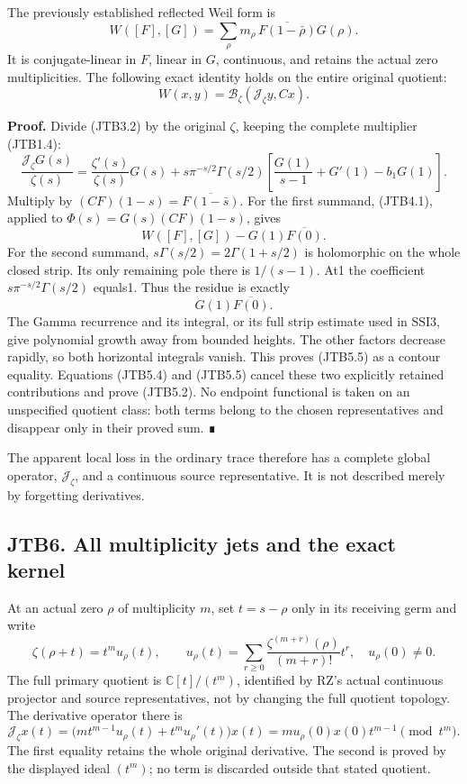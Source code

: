The previously established reflected Weil form is \[
W([F],[G])=\sum_\rho m_\rho\,
\overline{F(1-\bar\rho)}G(\rho).
\tag{JTB5.1}
\] It is conjugate-linear in \(F\), linear in \(G\), continuous, and
retains the actual zero multiplicities. The following exact identity
holds on the entire original quotient: \[
\boxed{W(x,y)=\mathscr B_\zeta(\mathcal J_\zeta y,Cx).}
\tag{JTB5.2}
\]

\textbf{Proof.} Divide (JTB3.2) by the original \(\zeta\), keeping the
complete multiplier (JTB1.4): \[
\frac{\mathscr J_\zeta G(s)}{\zeta(s)}
=\frac{\zeta'(s)}{\zeta(s)}G(s)
+s\pi^{-s/2}\Gamma(s/2)
\left[\frac{G(1)}{s-1}+G'(1)-b_1G(1)\right].
\tag{JTB5.3}
\] Multiply by \((CF)(1-s)=\overline{F(1-\bar s)}\). For the first
summand, (JTB4.1), applied to \(\Phi(s)=G(s)(CF)(1-s)\), gives \[
W([F],[G])-G(1)\overline{F(0)}.
\tag{JTB5.4}
\] For the second summand, \(s\Gamma(s/2)=2\Gamma(1+s/2)\) is
holomorphic on the whole closed strip. Its only remaining pole there is
\(1/(s-1)\). At1 the coefficient \(s\pi^{-s/2}\Gamma(s/2)\) equals1.
Thus the residue is exactly \[
G(1)\overline{F(0)}.
\tag{JTB5.5}
\] The Gamma recurrence and its integral, or its full strip estimate
used in SSI3, give polynomial growth away from bounded heights. The
other factors decrease rapidly, so both horizontal integrals vanish.
This proves (JTB5.5) as a contour equality. Equations (JTB5.4) and
(JTB5.5) cancel these two explicitly retained contributions and prove
(JTB5.2). No endpoint functional is taken on an unspecified quotient
class: both terms belong to the chosen representatives and disappear
only in their proved sum. ∎

The apparent local loss in the ordinary trace therefore has a complete
global operator, \(\mathcal J_\zeta\), and a continuous source
representative. It is not described merely by forgetting derivatives.

\subsection{JTB6. All multiplicity jets and the exact
kernel}\label{jtb6.-all-multiplicity-jets-and-the-exact-kernel}

At an actual zero \(\rho\) of multiplicity \(m\), set \(t=s-\rho\) only
in its receiving germ and write \[
\zeta(\rho+t)=t^m u_\rho(t),\qquad
u_\rho(t)=\sum_{r\ge0}
\frac{\zeta^{(m+r)}(\rho)}{(m+r)!}t^r,
\quad u_\rho(0)\ne0.
\tag{JTB6.1}
\] The full primary quotient is \(\mathbb C[t]/(t^m)\), identified by
RZ's actual continuous projector and source representatives, not by
changing the full quotient topology. The derivative operator there is \[
\mathcal J_\zeta x(t)
=\bigl(mt^{m-1}u_\rho(t)+t^m u_\rho'(t)\bigr)x(t)
=m u_\rho(0)x(0)t^{m-1}\pmod{t^m}.
\tag{JTB6.2}
\] The first equality retains the whole original derivative. The second
is proved by the displayed ideal \((t^m)\); no term is discarded outside
that stated quotient.

